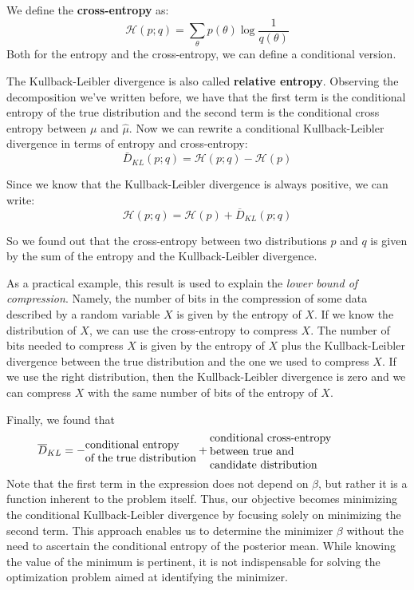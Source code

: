 We define the \textbf{cross-entropy} as:
\[
    \mathcal{H}(p;q) = \sum_{\theta} p(\theta) \log \frac{1}{q(\theta)}
\]
Both for the entropy and the cross-entropy, we can define a conditional version.

The Kullback-Leibler divergence is also called \textbf{relative entropy}. 
Observing the decomposition we've written before, we have that the first term is the conditional entropy of the true distribution and the second term is the conditional cross entropy between $\mu$ and $\hat \mu$.
Now we can rewrite a conditional Kullback-Leibler divergence in terms of entropy and cross-entropy:
\[
    \bar{D}_{KL}(p;q) = \mathcal{H}(p;q) - \mathcal{H}(p)
\]

Since we know that the Kullback-Leibler divergence is always positive, we can write:
\[
    \mathcal{H}(p;q) = \mathcal{H}(p) + \overline{D}_{KL}(p;q)
\]

So we found out that the cross-entropy between two distributions $p$ and $q$ is given by the sum of the entropy and the Kullback-Leibler divergence. 

As a practical example, this result is used to explain the \textit{lower bound of compression}. Namely, the number of bits in the compression of some data described by a random variable $X$ is given by the entropy of $X$. If we know the distribution of $X$, we can use the cross-entropy to compress $X$. The number of bits needed to compress $X$ is given by the entropy of $X$ plus the Kullback-Leibler divergence between the true distribution and the one we used to compress $X$. If we use the right distribution, then the Kullback-Leibler divergence is zero and we can compress $X$ with the same number of bits of the entropy of $X$.

Finally, we found that
\[
    \overline{D}_{KL} = - \parbox{10em}{conditional entropy \\of the true distribution} + \parbox{15em}{ conditional cross-entropy\\ between true and \\ candidate distribution}
\]
Note that the first term in the expression does not depend on $\beta$, but rather it is a function inherent to the problem itself. 
Thus, our objective becomes minimizing the conditional Kullback-Leibler divergence by focusing solely on minimizing the second term. This approach enables us to determine the minimizer $\beta$ without the need to ascertain the conditional entropy of the posterior mean. While knowing the value of the minimum is pertinent, it is not indispensable for solving the optimization problem aimed at identifying the minimizer. 

